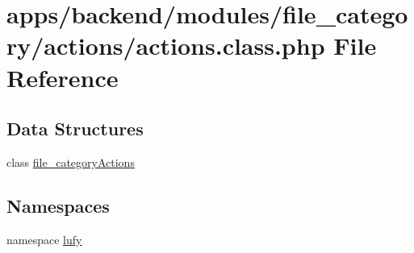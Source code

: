 \hypertarget{backend_2modules_2file__category_2actions_2actions_8class_8php}{\section{apps/backend/modules/file\-\_\-category/actions/actions.class.\-php File Reference}
\label{backend_2modules_2file__category_2actions_2actions_8class_8php}
}
\subsection*{Data Structures}
\begin{DoxyCompactItemize}
\item 
class \hyperlink{classfile__category_actions}{file\-\_\-category\-Actions}
\end{DoxyCompactItemize}
\subsection*{Namespaces}
\begin{DoxyCompactItemize}
\item 
namespace \hyperlink{namespacelufy}{lufy}
\end{DoxyCompactItemize}
